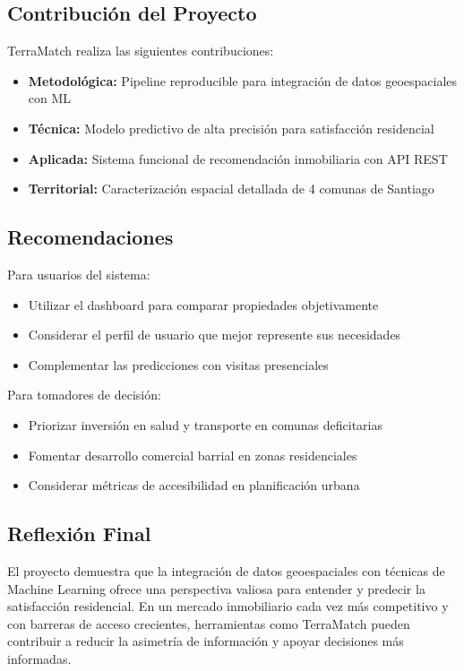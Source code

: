 \documentclass[11pt,letterpaper]{article}
\begin{document}
\subsection{Contribución del Proyecto}

TerraMatch realiza las siguientes contribuciones:

\begin{itemize}
    \item \textbf{Metodológica:} Pipeline reproducible para integración de datos geoespaciales con ML
    \item \textbf{Técnica:} Modelo predictivo de alta precisión para satisfacción residencial
    \item \textbf{Aplicada:} Sistema funcional de recomendación inmobiliaria con API REST
    \item \textbf{Territorial:} Caracterización espacial detallada de 4 comunas de Santiago
\end{itemize}

\subsection{Recomendaciones}

Para usuarios del sistema:
\begin{itemize}
    \item Utilizar el dashboard para comparar propiedades objetivamente
    \item Considerar el perfil de usuario que mejor represente sus necesidades
    \item Complementar las predicciones con visitas presenciales
\end{itemize}

Para tomadores de decisión:
\begin{itemize}
    \item Priorizar inversión en salud y transporte en comunas deficitarias
    \item Fomentar desarrollo comercial barrial en zonas residenciales
    \item Considerar métricas de accesibilidad en planificación urbana
\end{itemize}

\subsection{Reflexión Final}

El proyecto demuestra que la integración de datos geoespaciales con técnicas de Machine Learning ofrece una perspectiva valiosa para entender y predecir la satisfacción residencial. En un mercado inmobiliario cada vez más competitivo y con barreras de acceso crecientes, herramientas como TerraMatch pueden contribuir a reducir la asimetría de información y apoyar decisiones más informadas.
\end{document}
